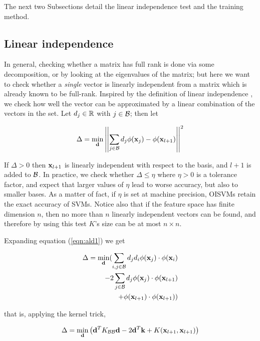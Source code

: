 The next two Subsections detail the linear independence test and the
training method.

\subsection*{Linear independence}

In general, checking whether a matrix has full rank is done via some
decomposition, or by looking at the eigenvalues of the matrix; but
here we want to check whether a \emph{single} vector is linearly
independent from a matrix which is already known to be
full-rank. Inspired by the definition of linear independence
\cite{EngelMM02sparse}, we check how well the vector can be
approximated by a linear combination of the vectors in the set. Let
$d_j \in \mathbb{R}$ with $j \in \mathcal{B}$; then let

\begin{equation} \label{eqn:ald1}
  \Delta = \min_{\mathbf{d}} \left|\left|\sum_{j \in \mathcal{B}} d_j \phi(\mathbf{x}_j) - \phi(\mathbf{x}_{l+1}) \right|\right|^2
\end{equation}

If $\Delta > 0$ then $\mathbf{x}_{l+1}$ is linearly independent with respect
to the basis, and $l+1$ is added to $\mathcal{B}$. In practice, we check
whether $\Delta \leq \eta$ where $\eta > 0$ is a tolerance factor, and
expect that larger values of $\eta$ lead to worse accuracy, but also
to smaller bases. As a matter of fact, if $\eta$ is set at machine
precision, OISVMs retain the exact accuracy of SVMs. Notice also that
if the feature space has finite dimension $n$, then no more than $n$
linearly independent vectors can be found, and therefore by using this
test $K$'s size can be at most $n \times n$.

Expanding equation (\ref{eqn:ald1}) we get

\begin{eqnarray} \label{eqn:ald2}
  \Delta = \min_{\mathbf{d}} (
      \sum_{i,j \in \mathcal{B}} d_j d_i \phi(\mathbf{x}_j) \cdot \phi(\mathbf{x}_i) \\
    - 2\sum_{j \in \mathcal{B}} d_j \phi(\mathbf{x}_j) \cdot \phi(\mathbf{x}_{l+1}) \nonumber \\
    + \phi(\mathbf{x}_{l+1}) \cdot \phi(\mathbf{x}_{l+1}) ) \nonumber
\end{eqnarray}

\noindent that is, applying the kernel trick,

\begin{equation} \label{eqn:ald3}
  \Delta = \min_{\mathbf{d}} \left(
      \mathbf{d}^T K_{\mathcal{B}\mathcal{B}}\mathbf{d}
    - 2 \mathbf{d}^T \mathbf{k}
    + K(\mathbf{x}_{l+1},\mathbf{x}_{l+1})
  \right)
\end{equation}

